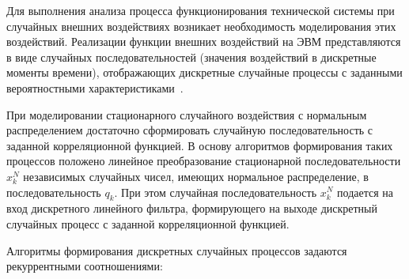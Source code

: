 Для выполнения анализа процесса функционирования технической
системы при случайных внешних воздействиях возникает необходимость
моделирования этих воздействий. Реализации функции внешних воздействий на
ЭВМ представляются в виде случайных последовательностей (значения
воздействий в дискретные моменты времени), отображающих дискретные
случайные процессы с заданными вероятностными характеристиками~\cite{modeling:2004}.

При моделировании стационарного случайного воздействия с нормальным
распределением достаточно сформировать случайную последовательность с
заданной корреляционной функцией. В основу алгоритмов формирования таких
процессов положено линейное преобразование стационарной
последовательности ${x}_{k}^{N}$ независимых случайных чисел, имеющих нормальное
распределение, в последовательность ${q}_{k}$. При этом случайная
последовательность ${x}_{k}^{N}$ подается на вход дискретного линейного фильтра,
формирующего на выходе дискретный случайных процесс с заданной
корреляционной функцией.

Алгоритмы формирования дискретных случайных процессов задаются
рекуррентными соотношениями: